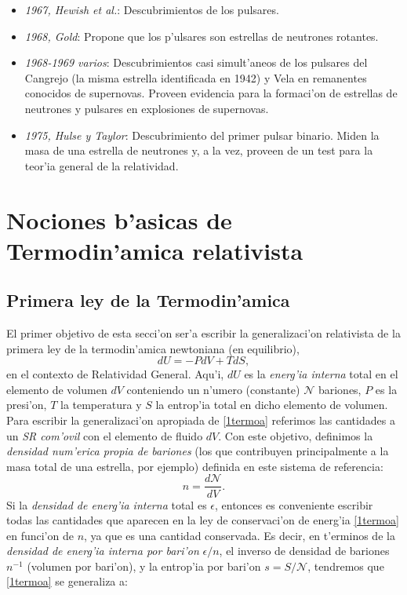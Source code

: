 \begin{itemize}
\item \emph{1967, Hewish et al.}: Descubrimientos de los pulsares.
\item \emph{1968, Gold}: Propone que los p'ulsares son estrellas de neutrones rotantes.
\item \emph{1968-1969 varios}: Descubrimientos casi simult'aneos de los pulsares del Cangrejo (la misma estrella identificada en 1942) y Vela en remanentes conocidos de supernovas. Proveen evidencia para la formaci'on de estrellas de neutrones y pulsares en explosiones de supernovas.
\item \emph{1975, Hulse y Taylor}: Descubrimiento del primer pulsar binario. Miden la masa de una estrella de neutrones y, a la vez, proveen de un test para la teor'ia general de la relatividad.
\end{itemize}

\chapter[Nociones de Termodin'amica]{Nociones b'asicas de Termodin'amica relativista}\label{cap:termo}
\section{Primera ley de la Termodin'amica}
El primer objetivo de esta secci'on ser'a escribir la generalizaci'on relativista de la primera ley de la termodin'amica newtoniana (en equilibrio),
\begin{equation}\label{1termoa}
dU=-PdV+TdS,
\end{equation}
en el contexto de Relatividad General. Aqu'i, $dU$ es la \textit{energ'ia interna} total en el elemento de volumen $dV$ conteniendo un n'umero (constante) $\mathcal{N}$ bariones, $P$ es la presi'on, $T$ la temperatura y $S$ la entrop'ia total en dicho elemento de volumen. Para escribir la generalizaci'on apropiada de \eqref{1termoa} referimos las cantidades a un \textit{SR com'ovil} con el elemento de fluido $dV$. Con este objetivo, definimos la \textit{densidad num'erica propia de bariones} (los que contribuyen principalmente a la masa total de una estrella, por ejemplo) definida en este sistema de referencia:
\begin{equation}\label{densidadbarionica}
n=\frac{d\mathcal{N}}{dV}.
\end{equation}
Si la \textit{densidad de energ'ia interna} total es $\epsilon$, 
entonces es conveniente escribir todas las cantidades que aparecen en la ley de conservaci'on de energ'ia \eqref{1termoa} en funci'on de $n$, ya que es una cantidad conservada. Es decir, en  t'erminos de la \textit{densidad de energ'ia interna por bari'on} $\epsilon/n$, el inverso de densidad de bariones $n^{-1}$ (volumen por bari'on), y la entrop'ia por bari'on $s=S/\mathcal{N}$, tendremos que \eqref{1termoa} se generaliza a:


